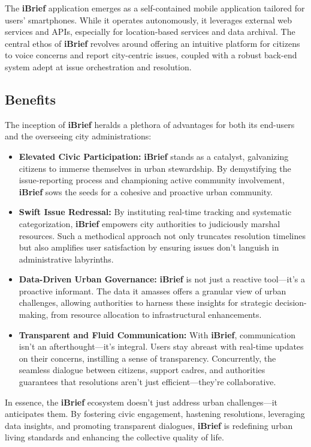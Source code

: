 The \textbf{iBrief} application emerges as a self-contained \gls{mobile application} tailored for users' smartphones. While it operates autonomously, it leverages external web services and \gls{API}s, especially for location-based services and data archival. The central ethos of \textbf{iBrief} revolves around offering an intuitive platform for citizens to voice concerns and report city-centric issues, coupled with a robust \gls{back-end} system adept at issue orchestration and resolution.

\subsection{Benefits}

The inception of \textbf{iBrief} heralds a plethora of advantages for both its end-users and the overseeing city administrations:

    \begin{itemize}
        \item \textbf{Elevated Civic Participation:} \textbf{iBrief} stands as a catalyst, galvanizing citizens to immerse themselves in urban stewardship. By demystifying the issue-reporting process and championing active community involvement, \textbf{iBrief} sows the seeds for a cohesive and proactive urban community.
        
        \item \textbf{Swift Issue Redressal:} By instituting real-time tracking and systematic categorization, \textbf{iBrief} empowers city authorities to judiciously marshal resources. Such a methodical approach not only truncates resolution timelines but also amplifies user satisfaction by ensuring issues don't languish in administrative labyrinths.
        
        \item \textbf{Data-Driven Urban Governance:} \textbf{iBrief} is not just a reactive tool—it's a proactive informant. The data it amasses offers a granular view of urban challenges, allowing authorities to harness these insights for strategic decision-making, from resource allocation to infrastructural enhancements.
        
        \item \textbf{Transparent and Fluid Communication:} With \textbf{iBrief}, communication isn't an afterthought—it's integral. Users stay abreast with real-time updates on their concerns, instilling a sense of transparency. Concurrently, the seamless dialogue between citizens, support cadres, and authorities guarantees that resolutions aren't just efficient—they're collaborative.
    \end{itemize}

In essence, the \textbf{iBrief} ecosystem doesn't just address urban challenges—it anticipates them. By fostering civic engagement, hastening resolutions, leveraging data insights, and promoting transparent dialogues, \textbf{iBrief} is redefining urban living standards and enhancing the collective quality of life.
